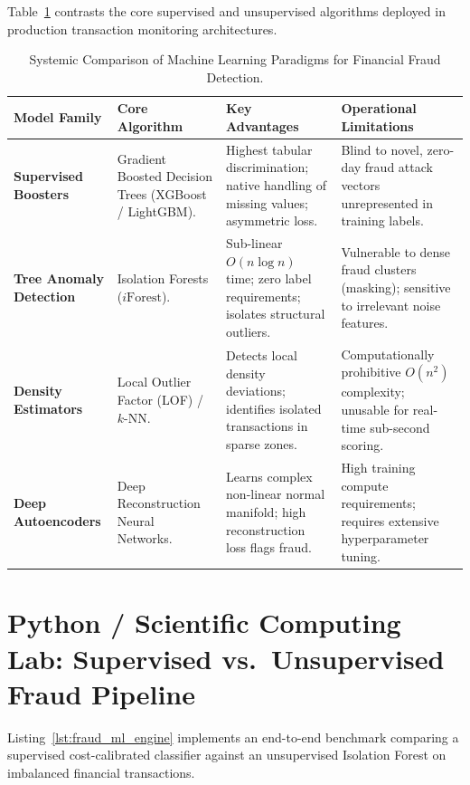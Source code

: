 Table~\ref{tab:comparison_fraud_models} contrasts the core supervised and unsupervised algorithms deployed in production transaction monitoring architectures.

\begin{table}[htbp]
\centering
\small
\begin{tabularx}{\textwidth}{lXXX}
\toprule
\textbf{Model Family} & \textbf{Core Algorithm} & \textbf{Key Advantages} & \textbf{Operational Limitations} \\
\midrule
\textbf{Supervised Boosters} & Gradient Boosted Decision Trees (XGBoost / LightGBM). & Highest tabular discrimination; native handling of missing values; asymmetric loss. & Blind to novel, zero-day fraud attack vectors unrepresented in training labels. \\
\addlinespace
\textbf{Tree Anomaly Detection} & Isolation Forests ($i\text{Forest}$). & Sub-linear $O(n \log n)$ time; zero label requirements; isolates structural outliers. & Vulnerable to dense fraud clusters (masking); sensitive to irrelevant noise features. \\
\addlinespace
\textbf{Density Estimators} & Local Outlier Factor (LOF) / $k$-NN. & Detects local density deviations; identifies isolated transactions in sparse zones. & Computationally prohibitive $O(n^2)$ complexity; unusable for real-time sub-second scoring. \\
\addlinespace
\textbf{Deep Autoencoders} & Deep Reconstruction Neural Networks. & Learns complex non-linear normal manifold; high reconstruction loss flags fraud. & High training compute requirements; requires extensive hyperparameter tuning. \\
\bottomrule
\end{tabularx}
\caption{Systemic Comparison of Machine Learning Paradigms for Financial Fraud Detection.}
\label{tab:comparison_fraud_models}
\end{table}

\section{Python / Scientific Computing Lab: Supervised vs.~Unsupervised Fraud Pipeline}

Listing~\ref{lst:fraud_ml_engine} implements an end-to-end benchmark comparing a supervised cost-calibrated classifier against an unsupervised Isolation Forest on imbalanced financial transactions.

